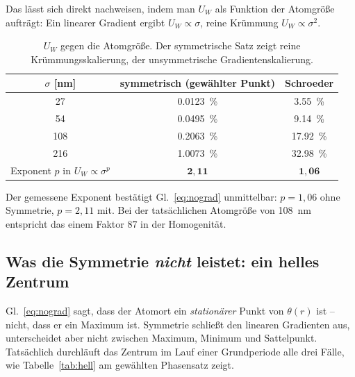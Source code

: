 \documentclass[11pt,a4paper]{article}
\newcommand{\Uw}{\ensuremath{U_W}}
\begin{document}
Das lässt sich direkt nachweisen, indem man $\Uw$ als Funktion der Atomgröße
aufträgt: Ein linearer Gradient ergibt $\Uw\propto\sigma$, reine Krümmung
$\Uw\propto\sigma^{2}$.

\begin{table}[htb]
  \centering
  \caption{$\Uw$ gegen die Atomgröße. Der symmetrische Satz zeigt reine
  Krümmungsskalierung, der unsymmetrische Gradientenskalierung.}
  \label{tab:scaling}
  \begin{tabular}{ccc}
    \toprule
    $\sigma$ [\si{\nano\meter}] & symmetrisch (gewählter Punkt) & Schroeder\\
    \midrule
     27 & \SI{0.0123}{\percent} & \SI{3.55}{\percent}\\
     54 & \SI{0.0495}{\percent} & \SI{9.14}{\percent}\\
    108 & \SI{0.2063}{\percent} & \SI{17.92}{\percent}\\
    216 & \SI{1.0073}{\percent} & \SI{32.98}{\percent}\\
    \midrule
    Exponent $p$ in $\Uw\propto\sigma^{p}$ & $\mathbf{2{,}11}$ & $\mathbf{1{,}06}$\\
    \bottomrule
  \end{tabular}
\end{table}

Der gemessene Exponent bestätigt Gl.~\eqref{eq:nograd} unmittelbar: $p=1{,}06$
ohne Symmetrie, $p=2{,}11$ mit. Bei der tatsächlichen Atomgröße von
\SI{108}{\nano\meter} entspricht das einem Faktor $87$ in der Homogenität.

\subsection{Was die Symmetrie \emph{nicht} leistet: ein helles Zentrum}

Gl.~\eqref{eq:nograd} sagt, dass der Atomort ein \emph{stationärer} Punkt von
$\theta(r)$ ist -- nicht, dass er ein Maximum ist. Symmetrie schließt den
linearen Gradienten aus, unterscheidet aber nicht zwischen Maximum, Minimum
und Sattelpunkt. Tatsächlich durchläuft das Zentrum im Lauf einer
Grundperiode alle drei Fälle, wie Tabelle~\ref{tab:hell} am gewählten
Phasensatz zeigt.
\end{document}
